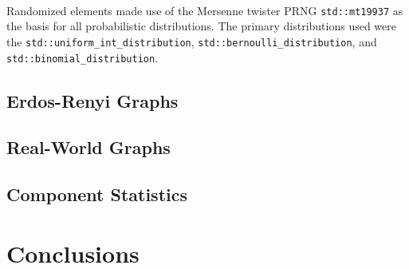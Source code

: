 \documentclass[11pt,epsf]{article}
\begin{document}
{{    \paragraph{}{
      Randomized elements\autocite{random} made use of the Mersenne twister PRNG \texttt{std::mt19937}\autocite{mt19337}
      as the basis for all probabilistic distributions. The primary distributions used were
      the \texttt{std::uniform\_int\_distribution}\autocite{uniformintdist},
      \texttt{std::bernoulli\_distribution}\autocite{bernoullidist}, and
      \texttt{std::binomial\_distribution}\autocite{binomialdist}.
    }
  }

  \subsection{Erdos-Renyi Graphs}{
  }
  \subsection{Real-World Graphs}{
  }
  \subsection{Component Statistics}{
  }
}

\section{Conclusions}{
}

\printbibliography
\end{document}
